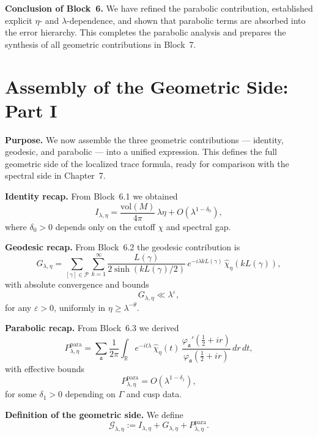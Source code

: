 \medskip

\noindent\textbf{Conclusion of Block~6.}
We have refined the parabolic contribution,  
established explicit $\eta$- and $\lambda$-dependence,  
and shown that parabolic terms are absorbed into the error hierarchy.  
This completes the parabolic analysis and prepares the synthesis of all geometric contributions in Block~7.


\section{Assembly of the Geometric Side: Part I}

\noindent\textbf{Purpose.}
We now assemble the three geometric contributions — identity, geodesic, and parabolic — 
into a unified expression.  
This defines the full geometric side of the localized trace formula, 
ready for comparison with the spectral side in Chapter~7.

\medskip

\noindent\textbf{Identity recap.}
From Block~6.1 we obtained
\[
  I_{\lambda,\eta}
  = \frac{\mathrm{vol}(M)}{4\pi}\, \lambda \eta
  + O(\lambda^{1-\delta_0}),
\]
where $\delta_0>0$ depends only on the cutoff $\chi$ and spectral gap.

\medskip

\noindent\textbf{Geodesic recap.}
From Block~6.2 the geodesic contribution is
\[
  G_{\lambda,\eta}
  = \sum_{[\gamma]\in \mathcal{P}} \sum_{k=1}^\infty
  \frac{L(\gamma)}{2\sinh(kL(\gamma)/2)}\,
  e^{-i\lambda kL(\gamma)}\,
  \widehat{\chi}_\eta(kL(\gamma)),
\]
with absolute convergence and bounds
\[
  G_{\lambda,\eta} \ll \lambda^\varepsilon,
\]
for any $\varepsilon>0$, uniformly in $\eta\ge \lambda^{-\theta}$.

\medskip

\noindent\textbf{Parabolic recap.}
From Block~6.3 we derived
\[
  P_{\lambda,\eta}^{\mathrm{para}}
  = \sum_{\mathfrak{a}} \frac{1}{2\pi}
  \int_{\mathbb{R}} e^{-it\lambda}\,
  \widehat{\chi}_\eta(t)\,
  \frac{\varphi_\mathfrak{a}'(\tfrac12+ir)}
       {\varphi_\mathfrak{a}(\tfrac12+ir)}\, dr\, dt,
\]
with effective bounds
\[
  P_{\lambda,\eta}^{\mathrm{para}} = O(\lambda^{1-\delta_1}),
\]
for some $\delta_1>0$ depending on $\Gamma$ and cusp data.

\medskip

\noindent\textbf{Definition of the geometric side.}
We define
\[
  \mathcal{G}_{\lambda,\eta}
  := I_{\lambda,\eta}
   + G_{\lambda,\eta}
   + P_{\lambda,\eta}^{\mathrm{para}}.
\]

